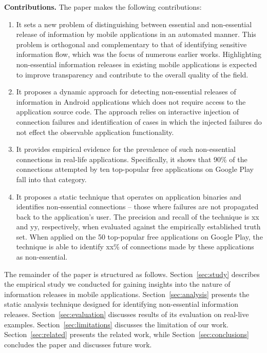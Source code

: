 \vspace{0.1in}
\noindent 
{\bf Contributions.}
The paper makes the following contributions:
\begin{enumerate}
\item It sets a new problem of distinguishing between essential and non-essential release of information by mobile applications in an automated manner. This problem is orthogonal and complementary to that of identifying sensitive information flow, which was the focus of numerous earlier works. 
Highlighting non-essential information releases in existing mobile applications is expected to improve transparency and contribute to the overall quality of the field. 
\item It proposes a dynamic approach for detecting non-essential releases of information in Android applications which does not require access to the application source code. 
The approach relies on interactive injection of connection failures and identification of cases in which the injected failures do not effect the observable application functionality. 
\item It provides empirical evidence for the prevalence of such non-essential connections in real-life applications. Specifically, it shows that 90\% of the connections attempted by ten top-popular free applications on Google Play fall into that category.    
\item It proposes a static technique that operates on application binaries and identifies non-essential connections -- those where failures are not propagated back to the application's user. The precision and recall of the technique is xx and yy, respectively, when evaluated against the empirically established truth set. 
When applied on the 50 top-popular free applications on Google Play, the technique is able to identify xx\% of connections made by these applications as non-essential.
\end{enumerate}

The remainder of the paper is structured as follows. Section~\ref{sec:study} describes the empirical study we conducted for gaining insights into the nature of information releases in mobile applications. Section~\ref{sec:analysis} presents the static analysis technique designed for identifying non-essential information releases. 
Section~\ref{sec:evaluation} discusses results of its evaluation on real-live examples. Section~\ref{sec:limitations} discusses the limitation of our work. Section~\ref{sec:related} presents the related work, while Section~\ref{sec:conclusions} concludes the paper and discusses future work. 



